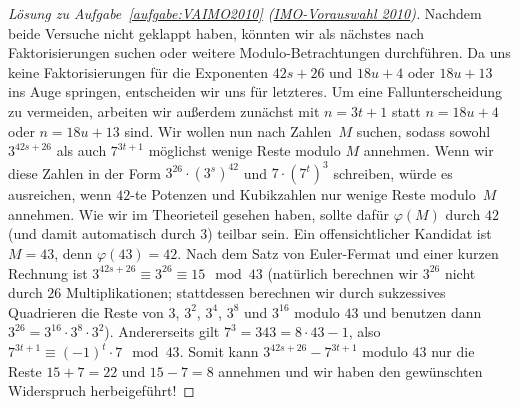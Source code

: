 \begin{proof}[Lösung zu Aufgabe~\ref{aufgabe:VAIMO2010} \textmd{(\href{https://www.mathe-wettbewerbe.de/fileadmin/Mathe-Wettbewerbe/AIMO/Aufgaben_und_Loesungen_AIMO/aufgaben_awb_10.pdf}{IMO-Vorauswahl 2010})}]
	Nachdem beide Versuche nicht geklappt haben, könnten wir als nächstes nach Faktorisierungen suchen oder weitere Modulo-Betrachtungen durchführen. Da uns keine Faktorisierungen für die Exponenten $42s+26$ und $18u+4$ oder $18u+13$ ins Auge springen, entscheiden wir uns für letzteres. Um eine Fallunterscheidung zu vermeiden, arbeiten wir außerdem zunächst mit $n=3t+1$ statt $n=18u+4$ oder $n=18u+13$ sind. Wir wollen nun nach Zahlen~$M$ suchen, sodass sowohl $3^{42s+26}$ als auch $7^{3t+1}$ möglichst wenige Reste modulo $M$ annehmen. Wenn wir diese Zahlen in der Form $3^{26}\cdot (3^s)^{42}$ und $7\cdot (7^t)^3$ schreiben, würde es ausreichen, wenn $42$-te Potenzen und Kubikzahlen nur wenige Reste modulo~$M$ annehmen. Wie wir im Theorieteil gesehen haben, sollte dafür $\varphi(M)$ durch $42$ (und damit automatisch durch $3$) teilbar sein. Ein offensichtlicher Kandidat ist $M=43$, denn $\varphi(43)=42$. Nach dem Satz von Euler-Fermat und einer kurzen Rechnung ist $3^{42s+26}\equiv 3^{26}\equiv 15\mod 43$ (natürlich berechnen wir $3^{26}$ nicht durch $26$ Multiplikationen; stattdessen berechnen wir durch sukzessives Quadrieren die Reste von $3$, $3^2$, $3^4$, $3^8$ und $3^{16}$ modulo $43$ und benutzen dann $3^{26}=3^{16}\cdot 3^8\cdot 3^2$). Andererseits gilt $7^3=343=8\cdot 43-1$, also $7^{3t+1}\equiv (-1)^t\cdot 7\mod 43$. Somit kann $3^{42s+26}-7^{3t+1}$ modulo $43$ nur die Reste $15+7=22$ und $15-7=8$ annehmen und wir haben den gewünschten Widerspruch herbeigeführt!
\end{proof}